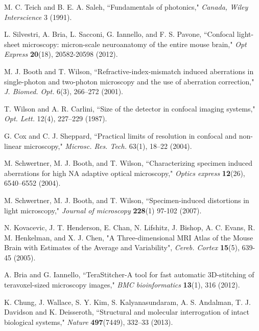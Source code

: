 \documentclass[12pt]{spieman}  %
\begin{document}
\begin{thebibliography}{0}
 M. C. Teich and B. E. A. Saleh, ``Fundamentals of photonics," \emph{Canada, Wiley Interscience} 3 (1991).

 L. Silvestri, A. Bria, L. Sacconi, G. Iannello,  and F. S. Pavone,  ``Confocal light-sheet microscopy: micron-scale neuroanatomy of the entire mouse brain," \emph{Opt Express} \textbf{20}(18), 20582-20598 (2012).

 M. J. Booth and T. Wilson, ``Refractive-index-mismatch induced aberrations in single-photon and two-photon microscopy and the use of aberration correction," \emph{J. Biomed. Opt.} 6(3), 266–272 (2001).

 T. Wilson and A. R. Carlini, ``Size of the detector in confocal imaging systems," \emph{Opt. Lett.} 12(4), 227–229 (1987).

 G. Cox and C. J. Sheppard, ``Practical limits of resolution in confocal and non-linear microscopy," \emph{Microsc. Res. Tech.} 63(1), 18–22 (2004).

 M. Schwertner, M. J. Booth, and T. Wilson, ``Characterizing specimen induced aberrations for high NA adaptive optical microscopy," \emph{Optics express} \textbf{12}(26), 6540–6552 (2004).

 M. Schwertner, M. J. Booth, and T. Wilson, ``Specimen‐induced distortions in light microscopy," \emph{Journal of microscopy} \textbf{228}(1) 97-102 (2007).



 N. Kovacevic, J. T. Henderson, E. Chan, N. Lifshitz, J. Bishop, A. C. Evans, R. M. Henkelman, and X. J. Chen, "A Three-dimensional MRI Atlas of the Mouse Brain with Estimates of the Average and Variability", \emph{Cereb. Cortex} \textbf{15}(5), 639-45 (2005).

 A. Bria and G. Iannello,  ``TeraStitcher-A tool for fast automatic 3D-stitching of teravoxel-sized microscopy images,"  \emph{BMC bioinformatics} \textbf{13}(1), 316 (2012).

 K. Chung, J. Wallace, S. Y. Kim, S. Kalyanasundaram, A. S. Andalman, T. J. Davidson and K. Deisseroth, ``Structural and molecular interrogation of intact biological systems," \emph{Nature} \textbf{497}(7449), 332–33 (2013).


\end{thebibliography}
\end{document}
